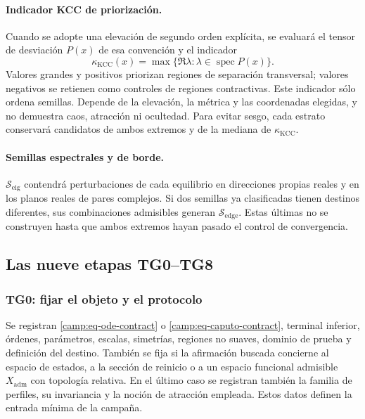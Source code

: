 \paragraph{Indicador KCC de priorización.}
Cuando se adopte una elevación de segundo orden explícita, se evaluará el
tensor de desviación \(P(x)\) de esa convención y el indicador
\begin{equation}
 \kappa_{\mathrm{KCC}}(x)=
 \max\{\Re\lambda:\lambda\in\operatorname{spec}P(x)\}.
 \label{camp:eq-kcc-score}
\end{equation}
Valores grandes y positivos priorizan regiones de separación transversal;
valores negativos se retienen como controles de regiones contractivas. Este
indicador sólo ordena semillas. Depende de la elevación, la métrica y las
coordenadas elegidas, y no demuestra caos, atracción ni ocultedad. Para evitar
sesgo, cada estrato conservará candidatos de ambos extremos y de la mediana de
\(\kappa_{\mathrm{KCC}}\).

\paragraph{Semillas espectrales y de borde.}
\(\mathcal S_{\mathrm{eig}}\) contendrá perturbaciones de cada equilibrio en
direcciones propias reales y en los planos reales de pares complejos. Si dos
semillas ya clasificadas tienen destinos diferentes, sus combinaciones
admisibles generan \(\mathcal S_{\mathrm{edge}}\). Estas últimas no se
construyen hasta que ambos extremos hayan pasado el control de convergencia.

\subsection{Las nueve etapas TG0--TG8}
\label{camp:etapas}

\subsubsection*{TG0: fijar el objeto y el protocolo}

Se registran \cref{camp:eq-ode-contract} o
\cref{camp:eq-caputo-contract}, terminal inferior, órdenes, parámetros,
escalas, simetrías, regiones no suaves, dominio de prueba y definición del
destino. También se fija si la afirmación buscada concierne al espacio de
estados, a la sección de reinicio o a un espacio funcional admisible
\(X_{\mathrm{adm}}\) con topología relativa. En el último caso se registran
también la familia de perfiles, su invariancia y la noción de atracción
empleada. Estos datos definen la entrada mínima de la campaña.

